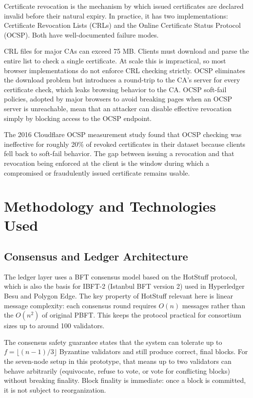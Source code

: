 \documentclass[12pt,a4paper]{article}
\begin{document}
Certificate revocation is the mechanism by which issued certificates are declared invalid before their natural expiry. In practice, it has two implementations: Certificate Revocation Lists (CRLs) and the Online Certificate Status Protocol (OCSP). Both have well-documented failure modes.

CRL files for major CAs can exceed 75 MB. Clients must download and parse the entire list to check a single certificate. At scale this is impractical, so most browser implementations do not enforce CRL checking strictly. OCSP eliminates the download problem but introduces a round-trip to the CA's server for every certificate check, which leaks browsing behavior to the CA. OCSP soft-fail policies, adopted by major browsers to avoid breaking pages when an OCSP server is unreachable, mean that an attacker can disable effective revocation simply by blocking access to the OCSP endpoint.

The 2016 Cloudflare OCSP measurement study found that OCSP checking was ineffective for roughly 20\% of revoked certificates in their dataset because clients fell back to soft-fail behavior. The gap between issuing a revocation and that revocation being enforced at the client is the window during which a compromised or fraudulently issued certificate remains usable.

\section{Methodology and Technologies Used}

\subsection{Consensus and Ledger Architecture}

The ledger layer uses a BFT consensus model based on the HotStuff protocol, which is also the basis for IBFT-2 (Istanbul BFT version 2) used in Hyperledger Besu and Polygon Edge. The key property of HotStuff relevant here is linear message complexity: each consensus round requires $O(n)$ messages rather than the $O(n^2)$ of original PBFT. This keeps the protocol practical for consortium sizes up to around 100 validators.

The consensus safety guarantee states that the system can tolerate up to $f = \lfloor(n-1)/3\rfloor$ Byzantine validators and still produce correct, final blocks. For the seven-node setup in this prototype, that means up to two validators can behave arbitrarily (equivocate, refuse to vote, or vote for conflicting blocks) without breaking finality. Block finality is immediate: once a block is committed, it is not subject to reorganization.
\end{document}
